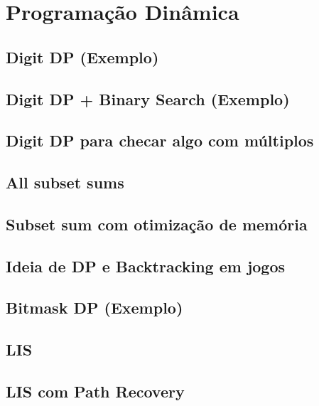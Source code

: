 \section{Programação Dinâmica}

\subsection{Digit DP (Exemplo)}


\subsection{Digit DP + Binary Search (Exemplo)}


\subsection{Digit DP para checar algo com múltiplos}


\subsection{All subset sums}


\subsection{Subset sum com otimização de memória}


\subsection{Ideia de DP e Backtracking em jogos}


\subsection{Bitmask DP (Exemplo)}


\subsection{LIS}


\subsection{LIS com Path Recovery}


